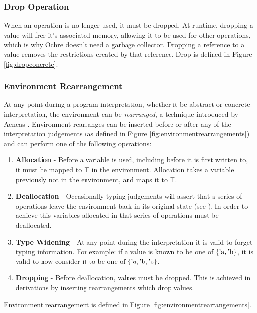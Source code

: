 \documentclass[12pt,twoside]{report}
\begin{document}
\subsubsection{Drop Operation}
When an operation is no longer used, it must be dropped. At runtime, dropping a value will free it's associated memory, allowing it to be used for other operations, which is why Ochre doesn't need a garbage collector. Dropping a reference to a value removes the restrictions created by that reference. Drop is defined in Figure \ref{fig:dropconcrete}.

\subsubsection{Environment Rearrangement}
At any point during a program interpretation, whether it be abstract or concrete interpretation, the environment can be \textit{rearranged}, a technique introduced by Aeneas \cite{aeneas}. Environment rearranges can be inserted before or after any of the interpretation judgements (as defined in Figure \ref{fig:environmentrearrangements}) and can perform one of the following operations:

\begin{enumerate}
  \item \textbf{Allocation} - Before a variable is used, including before it is first written to, it must be mapped to $\top$ in the environment. Allocation takes a variable previously not in the environment, and maps it to $\top$.
  \item \textbf{Deallocation} - Occasionally typing judgements will assert that a series of operations leave the environment back in its original state (see ). In order to achieve this variables allocated in that series of operations must be deallocated.
  \item \textbf{Type Widening} - At any point during the interpretation it is valid to forget typing information. For example: if a value is known to be one of $\{ \text{'a}, \text{'b} \}$, it is valid to now consider it to be one of $\{ \text{'a}, \text{'b}, \text{'c} \}$.
  \item \textbf{Dropping} - Before deallocation, values must be dropped. This is achieved in derivations by inserting rearrangements which drop values.
\end{enumerate}

Environment rearrangement is defined in Figure \ref{fig:environmentrearrangements}.
\end{document}
